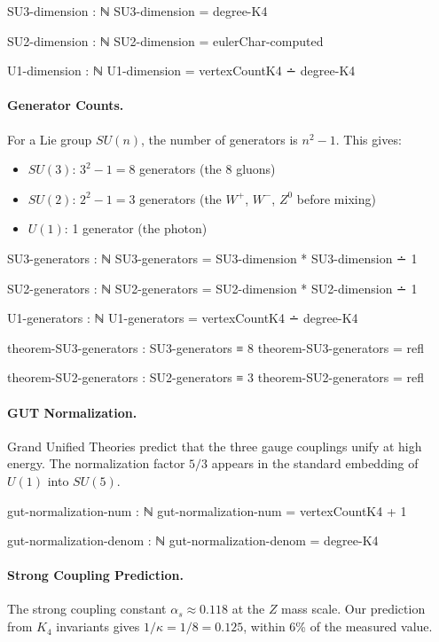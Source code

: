 \documentclass[11pt,a4paper]{book}
\begin{document}
\begin{code}
SU3-dimension : ℕ
SU3-dimension = degree-K4

SU2-dimension : ℕ
SU2-dimension = eulerChar-computed

U1-dimension : ℕ
U1-dimension = vertexCountK4 ∸ degree-K4
\end{code}

\paragraph{Generator Counts.}
For a Lie group $SU(n)$, the number of generators is $n^2 - 1$. This gives:
\begin{itemize}
\item $SU(3)$: $3^2 - 1 = 8$ generators (the 8 gluons)
\item $SU(2)$: $2^2 - 1 = 3$ generators (the $W^+$, $W^-$, $Z^0$ before mixing)
\item $U(1)$: 1 generator (the photon)
\end{itemize}

\begin{code}
SU3-generators : ℕ
SU3-generators = SU3-dimension * SU3-dimension ∸ 1

SU2-generators : ℕ
SU2-generators = SU2-dimension * SU2-dimension ∸ 1


U1-generators : ℕ
U1-generators = vertexCountK4 ∸ degree-K4

theorem-SU3-generators : SU3-generators ≡ 8
theorem-SU3-generators = refl

theorem-SU2-generators : SU2-generators ≡ 3
theorem-SU2-generators = refl
\end{code}

\paragraph{GUT Normalization.}
Grand Unified Theories predict that the three gauge couplings unify at high energy. 
The normalization factor $5/3$ appears in the standard embedding of $U(1)$ into $SU(5)$.

\begin{code}
gut-normalization-num : ℕ
gut-normalization-num = vertexCountK4 + 1

gut-normalization-denom : ℕ
gut-normalization-denom = degree-K4
\end{code}

\paragraph{Strong Coupling Prediction.}
The strong coupling constant $\alpha_s \approx 0.118$ at the $Z$ mass scale. Our prediction 
from $K_4$ invariants gives $1/\kappa = 1/8 = 0.125$, within 6\% of the measured value.
\end{document}
